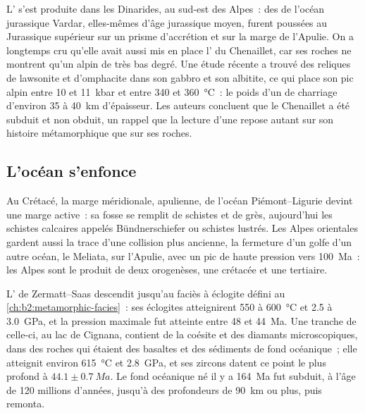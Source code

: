L' s'est produite dans les Dinarides, au sud-est des Alpes~: des  de l'océan jurassique
Vardar, elles-mêmes d'âge jurassique moyen, furent poussées au Jurassique supérieur sur un
prisme d'accrétion et sur la marge de l'Apulie. On a longtemps cru qu'elle avait aussi mis en place
l' du Chenaillet, car ses roches ne montrent qu'un  alpin de très bas degré.
Une étude récente a trouvé des reliques de lawsonite et d'omphacite dans son gabbro et son albitite,
ce qui place son pic alpin entre 10 et \qty{11}{kbar} et entre 340 et
\qty{360}{\celsius}~: le poids d'un  de charriage d'environ 35 à \qty{40}{km} d'épaisseur. Les auteurs
concluent que le Chenaillet a été subduit et non obduit, un rappel que la lecture d'une  repose
autant sur son histoire métamorphique que sur ses roches.

\subsection*{L'océan s'enfonce}

Au Crétacé, la marge méridionale, apulienne, de l'océan Piémont--Ligurie devint une marge active~: sa
fosse se remplit de schistes et de grès, aujourd'hui les schistes calcaires appelés
Bündnerschiefer ou schistes lustrés. Les Alpes orientales gardent aussi la trace d'une collision plus ancienne,
la fermeture d'un golfe d'un autre océan, le Meliata, sur l'Apulie, avec un pic de haute pression vers
\qty{100}{Ma}~: les Alpes sont le produit de deux orogenèses, une crétacée et une
tertiaire.

L' de Zermatt--Saas descendit jusqu'au faciès à éclogite défini au
\cref{ch:b2:metamorphic-facies}~: ses éclogites atteignirent 550 à \qty{600}{\celsius} et 2.5 à
\qty{3.0}{GPa}, et la pression maximale fut atteinte entre 48 et \qty{44}{Ma}. Une tranche
de celle-ci, au lac de Cignana, contient de la coésite et des diamants microscopiques, dans des roches
qui étaient des basaltes et des sédiments de fond océanique~; elle atteignit environ \qty{615}{\celsius}
et \qty{2.8}{GPa}, et ses zircons datent ce point le plus profond à $44.1 \pm \qty{0.7}{Ma}$. Le fond
océanique né il y a \qty{164}{Ma} fut subduit, à l'âge de 120 millions d'années, jusqu'à des profondeurs de
\qty{90}{km} ou plus, puis remonta.

